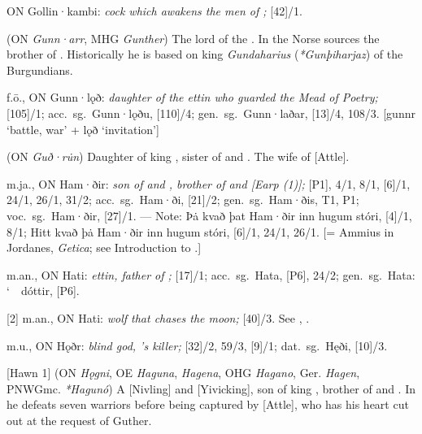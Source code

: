 \begin{itemize}
 ON Gollin·kambi:
  \emph{cock which awakens the men of ;} [42]/1.

 (ON \emph{Gunn·arr}, MHG \emph{Gunther})
  The lord of the .  In the Norse sources the brother of .  Historically he is based on king \emph{Gundaharius} (\emph{*Gunþiharjaz}) of the Burgundians.

 f.ō., ON Gunn·lǫð:
  \emph{daughter of the ettin  who guarded the Mead of Poetry;} [105]/1; acc.~sg.~Gunn·lǫðu, [110]/4; gen.~sg.~Gunn·laðar, [13]/4, 108/3.
  [gunnr ‘battle, war’ + lǫð ‘invitation’]

 (ON \emph{Guð·ru̇n})
  Daughter of king , sister of  and . The wife of [Attle].

 m.ja., ON Ham·ðir:
  \emph{son of  and , brother of  and [Earp (1)];} [P1], 4/1, 8/1, [6]/1, 24/1, 26/1, 31/2; acc.~sg.~Ham·ði, [21]/2;
  gen.~sg.~Ham·ðis,  T1, P1;
  voc.~sg.~Ham·ðir, [27]/1.
  --- Note: Þȧ kvað þat Ham·ðir inn hugum stóri, [4]/1, 8/1; Hitt kvað þȧ Ham·ðir inn hugum stóri, [6]/1, 24/1, 26/1.
  [= Ammius in Jordanes, \emph{Getica}; see Introduction to .]

 m.an., ON Hati:
  \emph{ettin, father of ;} [17]/1; acc.~sg.~Hata, [P6], 24/2; gen.~sg.~Hata: \char`~\ dóttir, [P6].

[2] m.an., ON Hati:
  \emph{wolf that chases the moon;} [40]/3.  See , .

 m.u., ON Hǫðr:
  \emph{blind god, ’s killer;} [32]/2, 59/3, [9]/1; dat.~sg.~Hęði, [10]/3.

[Hawn 1] (ON \emph{Hǫgni}, OE \emph{Haguna}, \emph{Hagena}, OHG \emph{Hagano}, Ger. \emph{Hagen}, PNWGmc. \emph{*Hagunó})
  A [Nivling] and [Yivicking], son of king , brother of  and . In  he defeats seven warriors before being captured by [Attle], who has his heart cut out at the request of Guther.


\end{itemize}
